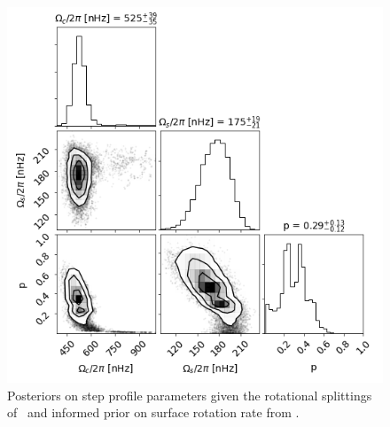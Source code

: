 \begin{figure}
\centering
    \includegraphics[width=\textwidth]{Figures/subgiant_chapter_figures/22_corner.png}
    \caption[Posteriors on step profile parameters given the rotational splittings of KIC 12508433 and informed prior on surface rotation rate from \citep{garcia_rotation_2014}.]{Posteriors on step profile parameters given the rotational splittings of \thestar\ and informed prior on surface rotation rate from \citep{garcia_rotation_2014}. }
    \label{fig:kic12408433_with_surface_rotation_prior}
\end{figure}


